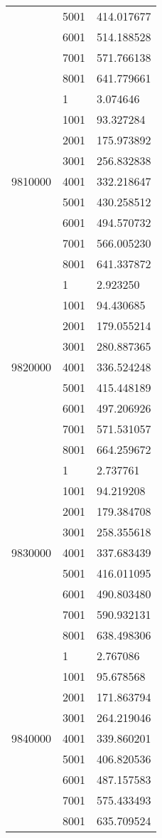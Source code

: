 \begin{table}[htb!]
\begin{tabular}{lll}
 & 5001 & 414.017677 \\
 & 6001 & 514.188528 \\
 & 7001 & 571.766138 \\
 & 8001 & 641.779661 \\
\multirow[c]{9}{*}{9810000} & 1 & 3.074646 \\
 & 1001 & 93.327284 \\
 & 2001 & 175.973892 \\
 & 3001 & 256.832838 \\
 & 4001 & 332.218647 \\
 & 5001 & 430.258512 \\
 & 6001 & 494.570732 \\
 & 7001 & 566.005230 \\
 & 8001 & 641.337872 \\
\multirow[c]{9}{*}{9820000} & 1 & 2.923250 \\
 & 1001 & 94.430685 \\
 & 2001 & 179.055214 \\
 & 3001 & 280.887365 \\
 & 4001 & 336.524248 \\
 & 5001 & 415.448189 \\
 & 6001 & 497.206926 \\
 & 7001 & 571.531057 \\
 & 8001 & 664.259672 \\
\multirow[c]{9}{*}{9830000} & 1 & 2.737761 \\
 & 1001 & 94.219208 \\
 & 2001 & 179.384708 \\
 & 3001 & 258.355618 \\
 & 4001 & 337.683439 \\
 & 5001 & 416.011095 \\
 & 6001 & 490.803480 \\
 & 7001 & 590.932131 \\
 & 8001 & 638.498306 \\
\multirow[c]{9}{*}{9840000} & 1 & 2.767086 \\
 & 1001 & 95.678568 \\
 & 2001 & 171.863794 \\
 & 3001 & 264.219046 \\
 & 4001 & 339.860201 \\
 & 5001 & 406.820536 \\
 & 6001 & 487.157583 \\
 & 7001 & 575.433493 \\
 & 8001 & 635.709524 \\

\end{tabular}
\end{table}

